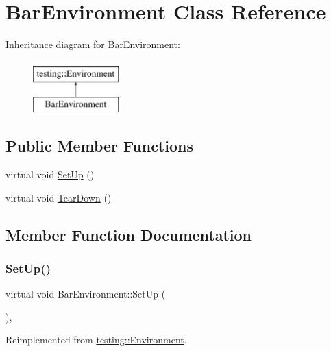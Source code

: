 \hypertarget{classBarEnvironment}{}\section{Bar\+Environment Class Reference}
\label{classBarEnvironment}
Inheritance diagram for Bar\+Environment\+:\begin{figure}[H]
\begin{center}
\leavevmode
\includegraphics[height=2.000000cm]{classBarEnvironment}
\end{center}
\end{figure}
\subsection*{Public Member Functions}
\begin{DoxyCompactItemize}
\item 
virtual void \mbox{\hyperlink{classBarEnvironment_a88e17c5dd1dcea7a4538f2f3c6bf7bdd}{Set\+Up}} ()
\item 
virtual void \mbox{\hyperlink{classBarEnvironment_a384f951da72a2a18bb0c2b3506376b09}{Tear\+Down}} ()
\end{DoxyCompactItemize}


\subsection{Member Function Documentation}
\mbox{\label{classBarEnvironment_a88e17c5dd1dcea7a4538f2f3c6bf7bdd}} 
\subsubsection{\texorpdfstring{SetUp()}{SetUp()}}
{\footnotesize\ttfamily virtual void Bar\+Environment\+::\+Set\+Up (\begin{DoxyParamCaption}{ }\end{DoxyParamCaption})\hspace{0.3cm}{\ttfamily [inline]}, {\ttfamily [virtual]}}



Reimplemented from \mbox{\hyperlink{classtesting_1_1Environment_a1bf8cafaa9d4eba9feb98655ee434eb3}{testing\+::\+Environment}}.

